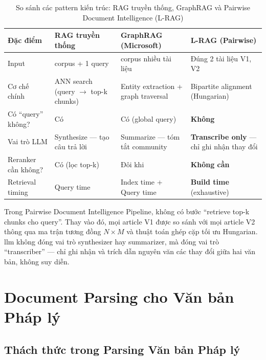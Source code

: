 \begin{table}[H]
    \centering
    \caption{So sánh các pattern kiến trúc: RAG truyền thống, GraphRAG và Pairwise Document Intelligence (L-RAG)}
    \label{tab:rag_comparison}
    \begin{tabularx}{\textwidth}{p{2.2cm} >{\raggedright\arraybackslash}X >{\raggedright\arraybackslash}X >{\raggedright\arraybackslash}X}
        \toprule
        \textbf{Đặc điểm} & \textbf{RAG truyền thống} & \textbf{GraphRAG (Microsoft)} & \textbf{L-RAG (Pairwise)}\\
        \midrule
        Input & 1 corpus + 1 query & 1 corpus nhiều tài liệu & Đúng 2 tài liệu V1, V2\\
        Cơ chế chính & ANN search (query $\rightarrow$ top-k chunks) & Entity extraction + graph traversal & Bipartite alignment (Hungarian)\\
        Có ``query'' không? & Có & Có (global query) & \textbf{Không}\\
        Vai trò LLM & Synthesize — tạo câu trả lời & Summarize — tóm tắt community & \textbf{Transcribe only} — chỉ ghi nhận thay đổi\\
        Reranker cần không? & Có (lọc top-k) & Đôi khi & \textbf{Không cần}\\
        Retrieval timing & Query time & Index time + Query time & \textbf{Build time} (exhaustive)\\
        \bottomrule
    \end{tabularx}
\end{table}

Trong Pairwise Document Intelligence Pipeline, không có bước ``retrieve top-k chunks cho query''. Thay vào đó, mọi article V1 được so sánh với mọi article V2 thông qua ma trận tương đồng $N \times M$ và thuật toán ghép cặp tối ưu Hungarian. \gls{llm} không đóng vai trò synthesizer hay summarizer, mà đóng vai trò ``transcriber'' — chỉ ghi nhận và trích dẫn nguyên văn các thay đổi giữa hai văn bản, không suy diễn.

\section{Document Parsing cho Văn bản Pháp lý}

\subsection{Thách thức trong Parsing Văn bản Pháp lý}

